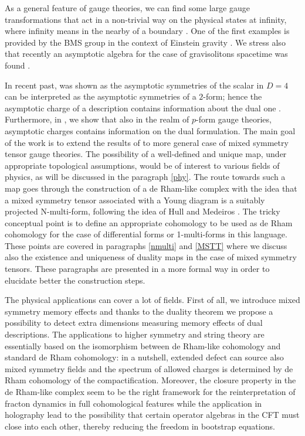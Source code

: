 \documentclass[a4paper,12pt]{article}
\begin{document}
As a general feature of gauge theories, we can find some large gauge transformations that act in a non-trivial way on the physical states at infinity, where infinity means in the nearby of a boundary \cite{Bondi:1962px, PhysRev.128.2851,Esmaeili:2020eua,Campoleoni:2018uib, Romoli:2024hlc}. One of the first examples is provided by the BMS group in the context of Einstein gravity \cite{Sachs:1962wk,Bondi:1962px,PhysRev.128.2851}. We stress also that recently an asymptotic algebra for the case of gravisolitons spacetime was found \cite{Belinski:2001ph,Manzoni:2021dij,Manzoni:2024agc}.

In recent past, was shown as the asymptotic symmetries of the scalar in $D=4$ can be interpreted as the asymptotic symmetries of a $2$-form; hence the asymptotic charge of a description contains information about the dual one \cite{Francia:2018jtb,Campiglia:2018see}. Furthermore, in \cite{Manzoni:2024tow},\cite{manzf} we show that also in the realm of $p$-form gauge theories, asymptotic charges contains information on the dual formulation. The main goal of the work is to extend the results of \cite{Manzoni:2024tow} to more general case of mixed symmetry tensor gauge theories. The possibility of a well-defined and unique map, under appropriate topological assumptions, would be of interest to various fields of physics, as will be discussed in the paragraph
\ref{phy}. The route towards such a map goes through the construction of a de Rham-like complex with the idea that a mixed symmetry tensor associated with a Young diagram is a suitably projected N-multi-form, following the idea of Hull and Medeiros \cite{Medeiros_2003}. The tricky conceptual point is to define an appropriate cohomology  to be used as de Rham cohomology for the case of differential forms or 1-multi-forms in this language. These points are covered in paragraphs \ref{nmulti} and \ref{MSTT} where we discuss also the existence and uniqueness of duality maps in the case of mixed symmetry tensors. These paragraphs are presented in a more formal way in order to elucidate better the construction steps.

The physical applications can cover a lot of fields. First of all, we introduce mixed symmetry memory effects and thanks to the duality theorem we propose a possibility to detect extra dimensions measuring memory effects of dual descriptions. The applications to higher symmetry and string theory are essentially based on the isomorphism between de Rham-like cohomology and standard de Rham cohomology: in a nutshell, extended defect can source also mixed symmetry fields and the spectrum of allowed charges is determined by de Rham cohomology of the compactification. Moreover, the closure property in the de Rham-like complex seem to be the right framework for the reinterpretation of fracton dynamics in full cohomological features while the application in holography lead to the possibility that certain operator algebras in the CFT must close into each other, thereby reducing the freedom in bootstrap equations.
\end{document}
